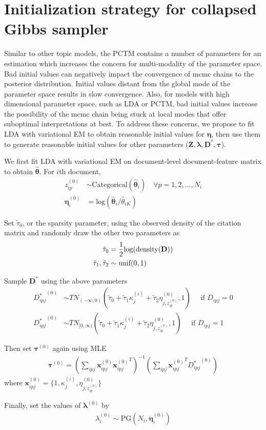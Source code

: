 \section{Initialization strategy for collapsed Gibbs sampler}
\label{sec:init}

Similar to other topic models, the PCTM contains a number of parameters for an estimation which increases the concern for multi-modality of the parameter space. Bad initial values can negatively impact the convergence of mcmc chains to the posterior distribution. Initial values distant from the global mode of the parameter space results in slow convergence. Also, for models with high dimensional parameter space, such as LDA or PCTM, bad initial values increase the possibility of the mcmc chain being stuck at local modes that offer suboptimal interpretations at best. To address these concerns, we propose to fit LDA with variational EM to obtain reasonable initial values for $\pmb\eta$, then use them to generate reasonable initial values for other parameters ($\textbf{Z},\pmb\lambda,\textbf{D}^*,\pmb\tau$). 

We first fit LDA with variational EM on document-level document-feature matrix to obtain $\hat{\pmb\theta}$. For $i$th document, 
\begin{align}
    z_{ip}^{(0)} &\sim \text{Categorical}(\hat{\pmb\theta}_i) \quad \forall p=1,2,...,N_i \nonumber \\
    \pmb\eta_{i}^{(0)} &= \text{log}(\hat{\pmb\theta}_i/\hat{\theta}_{iK})
\end{align}

Set $\tilde{\tau}_0$, or the sparsity parameter, using the observed density of the citation matrix and randomly draw the other two parameters as 
\begin{align}
    \tilde{\tau}_0 &= \frac{1}{2}\text{log}(\text{density(\textbf{D})}) \nonumber \\
    \tilde{\tau}_1,\tilde{\tau}_2 &\sim \text{unif}(0,1) 
\end{align}

Sample $\textbf{D}^*$ using the above parameters
\begin{align}
    {D_{ipj}^*}^{(0)} &\sim TN_{(-\infty,0)}(\tilde{\tau}_0 + \tilde{\tau}_1\kappa_j^{(i)} + \tilde{\tau}_2 \eta_{j,z_{ip}^{(0)}}^{(0)},1) \quad \text{ if } D_{ipj} = 0 \nonumber \\
    {D_{ipj}^*}^{(0)} &\sim TN_{[0,\infty)}(\tilde{\tau}_0 + \tilde{\tau}_1\kappa_j^{(i)} + \tilde{\tau}_2 \eta_{j,z_{ip}^{(0)}}^{(0)},1) \quad \text{ if } D_{ipj} = 1
\end{align}

Then set $\pmb\tau^{(0)}$ again using MLE
\begin{align}
    \pmb\tau^{(0)} = (\sum_{ipj}\textbf{x}_{ipj}^{(0)}{\textbf{x}_{ipj}^{(0)}}^T)^{-1} (\sum_{ipj}{\textbf{x}_{ipj}^{(0)}}^T{D_{ipj}^*}^{(0)})
\end{align}
where $\textbf{x}_{ipj}^{(0)} = \{1, \kappa_{j}^{(i)}, \eta_{j,z_{ip}^{(0)}}^{(0)} \}$

Finally, set the values of $\pmb\lambda^{(0)}$ by
\begin{align}
    \lambda_i^{(0)} \sim \text{PG}(N_i,\pmb\eta_i^{(0)})
\end{align}
